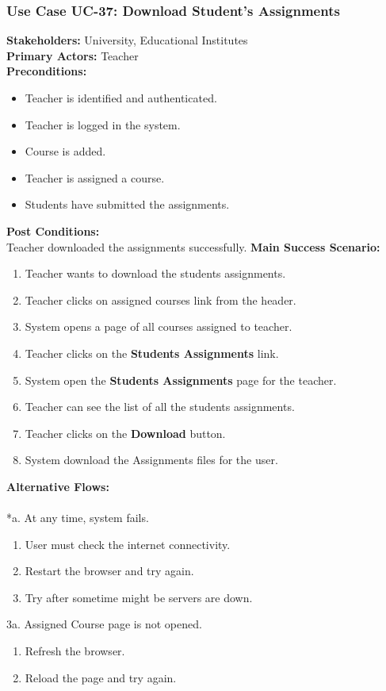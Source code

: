 \documentclass[12pt]{article}
\begin{document}
\subsubsection{Use Case UC-37: Download Student's Assignments}
\textbf{Stakeholders: } University, Educational Institutes \\
\textbf{Primary Actors: } Teacher \\
\textbf{Preconditions:}
\begin{itemize}
\item Teacher is identified and authenticated.
\item Teacher is logged in the system.
\item Course is added.
\item Teacher is assigned a course.
\item Students have submitted the assignments.
\end{itemize}
\textbf{Post Conditions: }\\
Teacher downloaded the assignments successfully.
\textbf{Main Success Scenario:}
\begin{enumerate}
\item Teacher wants to download the students assignments.
\item Teacher clicks on assigned courses link from the header.
\item System opens a page of all courses assigned to teacher.
\item Teacher clicks on the \textbf{Students Assignments} link.
\item System open the \textbf{Students Assignments} page for the teacher.
\item Teacher can see the list of all the students assignments.
\item Teacher clicks on the \textbf{Download} button.
\item System download the Assignments files for the user.
\end{enumerate}
\textbf{Alternative Flows:}\\
\\
*a. At any time, system fails.
\begin{enumerate}
\item User must check the internet connectivity.
\item Restart the browser and try again.
\item Try after sometime might be servers are down.
\end{enumerate}
3a. Assigned Course page is not opened.
\begin{enumerate}
\item Refresh the browser.
\item Reload the page and try again.
\end{enumerate}
\end{document}
